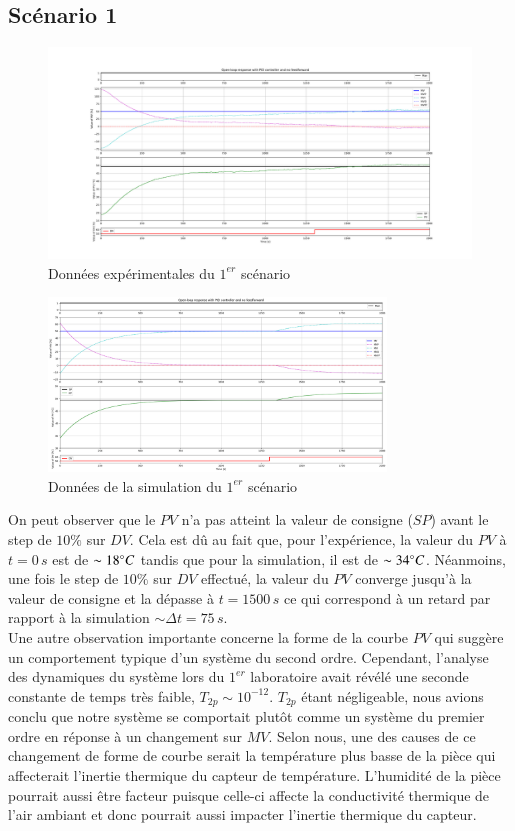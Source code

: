 \subsection{Scénario 1}
\begin{figure}[H]
	\centering
	\includegraphics[width=1\textwidth]{../Plots/Experiment_scenario_2_2024-03-30-20h20.pdf}
	\caption{Données expérimentales du $1^{er}$ scénario}
	\label{fig:exp_scenario1}
\end{figure}
\begin{figure}[H]
	\centering
	\includegraphics[width=0.8\textwidth]{figures/scenario2.png}
	\caption{Données de la simulation du $1^{er}$ scénario}
	\label{fig:sim_scenario1}
\end{figure}

On peut observer que le $PV$ n'a pas atteint la valeur de consigne ($SP$) avant le step de $10\%$ sur $DV$. Cela est dû au fait que, pour l'expérience,
la valeur du $PV$ à $t = 0\,s$ est de $\sim 18\degree C$ tandis que pour la simulation, il est de $\sim 34\degree C$. Néanmoins, une fois le step de $10\%$ sur $DV$ effectué,
la valeur du $PV$ converge jusqu'à la valeur de consigne et la dépasse à $t = 1500\,s$ ce qui correspond à un retard par rapport à la simulation $\sim \Delta t = 75\,s$. 
\\Une autre observation importante concerne la forme de la courbe $PV$ qui suggère un comportement typique d'un système du second ordre. Cependant, l'analyse des dynamiques du système 
lors du $1^{er}$ laboratoire avait révélé une seconde constante de temps très faible, $T_{2p} \sim 10^{-12}$. $T_{2p}$ étant négligeable, nous avions conclu que notre système se comportait
plutôt comme un système du premier ordre en réponse à un changement sur $MV$. Selon nous, une des causes de ce changement de forme de courbe serait la température plus basse de la pièce qui affecterait 
l'inertie thermique du capteur de température. L'humidité de la pièce pourrait aussi être facteur puisque celle-ci affecte la conductivité thermique de l'air 
ambiant et donc pourrait aussi impacter l'inertie thermique du capteur.

